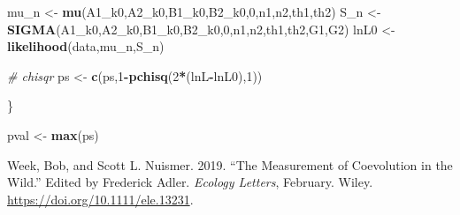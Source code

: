\documentclass[]{article}
\newenvironment{Shaded}{\begin{snugshade}}{\end{snugshade}}
\newcommand{\CommentTok}[1]{\textcolor[rgb]{0.56,0.35,0.01}{\textit{#1}}}
\newcommand{\DecValTok}[1]{\textcolor[rgb]{0.00,0.00,0.81}{#1}}
\newcommand{\KeywordTok}[1]{\textcolor[rgb]{0.13,0.29,0.53}{\textbf{#1}}}
\newcommand{\NormalTok}[1]{#1}
\newcommand{\OperatorTok}[1]{\textcolor[rgb]{0.81,0.36,0.00}{\textbf{#1}}}
\newcommand{\StringTok}[1]{\textcolor[rgb]{0.31,0.60,0.02}{#1}}
\begin{document}
\begin{Shaded}
\begin{Highlighting}[]
\NormalTok{  mu_n <-}\StringTok{ }\KeywordTok{mu}\NormalTok{(A1_k0,A2_k0,B1_k0,B2_k0,}\DecValTok{0}\NormalTok{,n1,n2,th1,th2)}
\NormalTok{  S_n <-}\StringTok{ }\KeywordTok{SIGMA}\NormalTok{(A1_k0,A2_k0,B1_k0,B2_k0,}\DecValTok{0}\NormalTok{,n1,n2,th1,th2,G1,G2)}
\NormalTok{  lnL0  <-}\StringTok{ }\KeywordTok{likelihood}\NormalTok{(data,mu_n,S_n)}
  
  \CommentTok{# chisqr}
\NormalTok{  ps <-}\StringTok{ }\KeywordTok{c}\NormalTok{(ps,}\DecValTok{1}\OperatorTok{-}\KeywordTok{pchisq}\NormalTok{(}\DecValTok{2}\OperatorTok{*}\NormalTok{(lnL}\OperatorTok{-}\NormalTok{lnL0),}\DecValTok{1}\NormalTok{))}
  
\NormalTok{\}}

\NormalTok{pval <-}\StringTok{ }\KeywordTok{max}\NormalTok{(ps)}
\end{Highlighting}
\end{Shaded}

\hypertarget{refs}{}
\leavevmode\hypertarget{ref-Week2019}{}%
Week, Bob, and Scott L. Nuismer. 2019. ``The Measurement of Coevolution
in the Wild.'' Edited by Frederick Adler. \emph{Ecology Letters},
February. Wiley. \url{https://doi.org/10.1111/ele.13231}.
\end{document}

